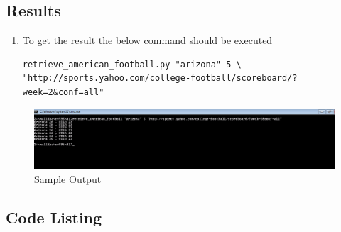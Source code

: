 \subsection{Results}
\begin{enumerate}
\item To get the result the below command should be executed 
\begin{verbatim}
retrieve_american_football.py "arizona" 5 \
"http://sports.yahoo.com/college-football/scoreboard/?week=2&conf=all"
\end{verbatim}
\end{enumerate}
\begin{figure}[ht]    
    \begin{center}
        \includegraphics[scale=0.45]{part2-result.png}
        \caption{Sample Output}
        \label{fig:X-distribution}
    \end{center}
\end{figure}

\subsection{Code Listing}
